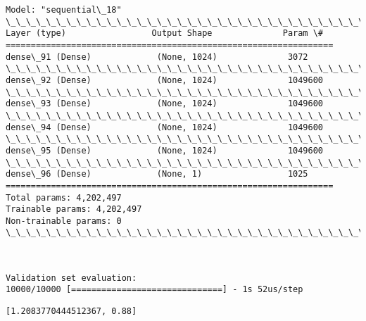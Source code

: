 \documentclass[11pt]{article}
\makeatletter
\newcommand{\boxspacing}{\kern\kvtcb@left@rule\kern\kvtcb@boxsep}
\newcommand{\prompt}[4]{
        \ttfamily\llap{{\color{#2}[#3]:\hspace{3pt}#4}}\vspace{-\baselineskip}
    }
\makeatother
\begin{document}
    \begin{Verbatim}[commandchars=\\\{\}]
Model: "sequential\_18"
\_\_\_\_\_\_\_\_\_\_\_\_\_\_\_\_\_\_\_\_\_\_\_\_\_\_\_\_\_\_\_\_\_\_\_\_\_\_\_\_\_\_\_\_\_\_\_\_\_\_\_\_\_\_\_\_\_\_\_\_\_\_\_\_\_
Layer (type)                 Output Shape              Param \#
=================================================================
dense\_91 (Dense)             (None, 1024)              3072
\_\_\_\_\_\_\_\_\_\_\_\_\_\_\_\_\_\_\_\_\_\_\_\_\_\_\_\_\_\_\_\_\_\_\_\_\_\_\_\_\_\_\_\_\_\_\_\_\_\_\_\_\_\_\_\_\_\_\_\_\_\_\_\_\_
dense\_92 (Dense)             (None, 1024)              1049600
\_\_\_\_\_\_\_\_\_\_\_\_\_\_\_\_\_\_\_\_\_\_\_\_\_\_\_\_\_\_\_\_\_\_\_\_\_\_\_\_\_\_\_\_\_\_\_\_\_\_\_\_\_\_\_\_\_\_\_\_\_\_\_\_\_
dense\_93 (Dense)             (None, 1024)              1049600
\_\_\_\_\_\_\_\_\_\_\_\_\_\_\_\_\_\_\_\_\_\_\_\_\_\_\_\_\_\_\_\_\_\_\_\_\_\_\_\_\_\_\_\_\_\_\_\_\_\_\_\_\_\_\_\_\_\_\_\_\_\_\_\_\_
dense\_94 (Dense)             (None, 1024)              1049600
\_\_\_\_\_\_\_\_\_\_\_\_\_\_\_\_\_\_\_\_\_\_\_\_\_\_\_\_\_\_\_\_\_\_\_\_\_\_\_\_\_\_\_\_\_\_\_\_\_\_\_\_\_\_\_\_\_\_\_\_\_\_\_\_\_
dense\_95 (Dense)             (None, 1024)              1049600
\_\_\_\_\_\_\_\_\_\_\_\_\_\_\_\_\_\_\_\_\_\_\_\_\_\_\_\_\_\_\_\_\_\_\_\_\_\_\_\_\_\_\_\_\_\_\_\_\_\_\_\_\_\_\_\_\_\_\_\_\_\_\_\_\_
dense\_96 (Dense)             (None, 1)                 1025
=================================================================
Total params: 4,202,497
Trainable params: 4,202,497
Non-trainable params: 0
\_\_\_\_\_\_\_\_\_\_\_\_\_\_\_\_\_\_\_\_\_\_\_\_\_\_\_\_\_\_\_\_\_\_\_\_\_\_\_\_\_\_\_\_\_\_\_\_\_\_\_\_\_\_\_\_\_\_\_\_\_\_\_\_\_
    \end{Verbatim}

    \begin{center}
    \end{center}
    { \hspace*{\fill} \\}
    
    \begin{Verbatim}[commandchars=\\\{\}]
Validation set evaluation:
10000/10000 [==============================] - 1s 52us/step
    \end{Verbatim}

            \begin{tcolorbox}[breakable, size=fbox, boxrule=.5pt, pad at break*=1mm, opacityfill=0]
\prompt{Out}{outcolor}{59}{\boxspacing}
\begin{Verbatim}[commandchars=\\\{\}]
[1.2083770444512367, 0.88]
\end{Verbatim}
\end{tcolorbox}
        
\end{document}
